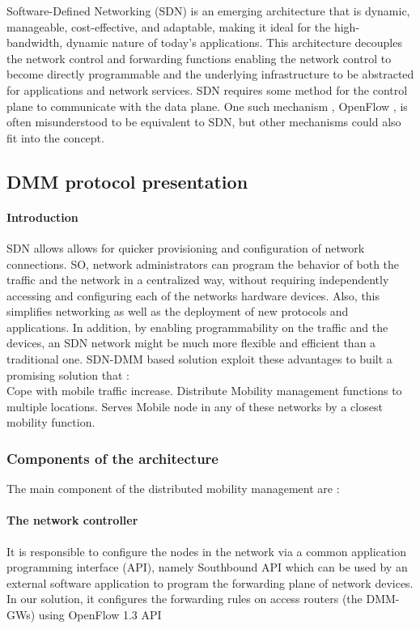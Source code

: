 \documentclass{article}
\begin{document}
Software-Defined Networking (SDN) is an emerging architecture that is
dynamic, manageable, cost-effective, and adaptable, making it ideal
for the high-bandwidth, dynamic nature of today's applications. This
architecture decouples the network control and forwarding functions
enabling the network control to become directly programmable and the
underlying infrastructure to be abstracted for applications and
network services.  SDN requires some method for the control plane to
communicate with the data plane. One such mechanism , OpenFlow , is
often misunderstood to be equivalent to SDN, but other mechanisms
could also fit into the concept.


\subsection{DMM protocol presentation}

\paragraph{Introduction}
SDN allows allows for quicker provisioning and configuration of
network connections. SO, network administrators can program the
behavior of both the traffic and the network in a centralized way,
without requiring independently accessing and configuring each of the
networks hardware devices. Also, this simplifies networking as well as
the deployment of new protocols and applications. In addition, by
enabling programmability on the traffic and the devices, an SDN
network might be much more flexible and efficient than a traditional
one. SDN-DMM based solution exploit these advantages to built a
promising solution that :\\
\newline
Cope with mobile traffic increase.  Distribute Mobility management
functions to multiple locations.  Serves Mobile node in any of these
networks by a closest mobility function.

\subsubsection{Components of the architecture}

The main component of the distributed mobility management are :

\paragraph{The network controller}
It is responsible to configure the nodes in the
network via a common application programming interface (API), namely
Southbound API which can be used by an external software application
to program the forwarding plane of network devices. In our solution,
it configures the forwarding rules on access routers (the DMM-GWs)
using OpenFlow 1.3 API
\end{document}
